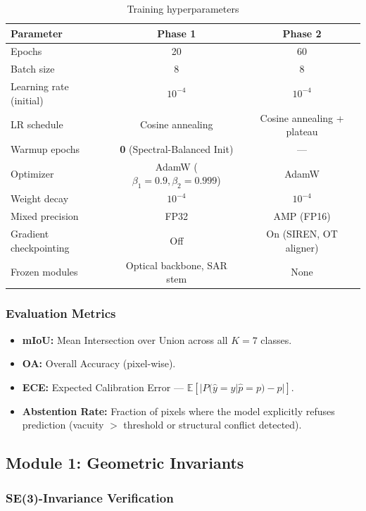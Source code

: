 \begin{table}[h]
\centering
\caption{Training hyperparameters}
\begin{tabular}{lcc}
\toprule
\textbf{Parameter} & \textbf{Phase 1} & \textbf{Phase 2} \\
\midrule
Epochs & 20 & 60 \\
Batch size & 8 & 8 \\
Learning rate (initial) & $10^{-4}$ & $10^{-4}$ \\
LR schedule & Cosine annealing & Cosine annealing + plateau \\
Warmup epochs & \textbf{0} (Spectral-Balanced Init) & — \\
Optimizer & AdamW ($\beta_1=0.9, \beta_2=0.999$) & AdamW \\
Weight decay & $10^{-4}$ & $10^{-4}$ \\
Mixed precision & FP32 & AMP (FP16) \\
Gradient checkpointing & Off & On (SIREN, OT aligner) \\
Frozen modules & Optical backbone, SAR stem & None \\
\bottomrule
\end{tabular}
\end{table}

\subsubsection{Evaluation Metrics}

\begin{itemize}[nosep]
    \item \textbf{mIoU:} Mean Intersection over Union across all $K=7$ classes.
    \item \textbf{OA:} Overall Accuracy (pixel-wise).
    \item \textbf{ECE:} Expected Calibration Error — $\mathbb{E}[|P(\hat{y}=y|\hat{p}=p) - p|]$.
    \item \textbf{Abstention Rate:} Fraction of pixels where the model explicitly
    refuses prediction (vacuity $>$ threshold or structural conflict detected).
\end{itemize}

\subsection{Module 1: Geometric Invariants}

\subsubsection{SE(3)-Invariance Verification}

